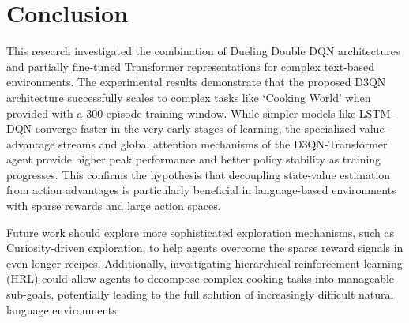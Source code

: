 \documentclass[11pt,a4paper]{article}
\begin{document}
\section{Conclusion}
This research investigated the combination of Dueling Double DQN architectures and partially fine-tuned Transformer representations for complex text-based environments. The experimental results demonstrate that the proposed D3QN architecture successfully scales to complex tasks like `Cooking World' when provided with a 300-episode training window. While simpler models like LSTM-DQN converge faster in the very early stages of learning, the specialized value-advantage streams and global attention mechanisms of the D3QN-Transformer agent provide higher peak performance and better policy stability as training progresses. This confirms the hypothesis that decoupling state-value estimation from action advantages is particularly beneficial in language-based environments with sparse rewards and large action spaces.

Future work should explore more sophisticated exploration mechanisms, such as Curiosity-driven exploration, to help agents overcome the sparse reward signals in even longer recipes. Additionally, investigating hierarchical reinforcement learning (HRL) could allow agents to decompose complex cooking tasks into manageable sub-goals, potentially leading to the full solution of increasingly difficult natural language environments.
\end{document}
